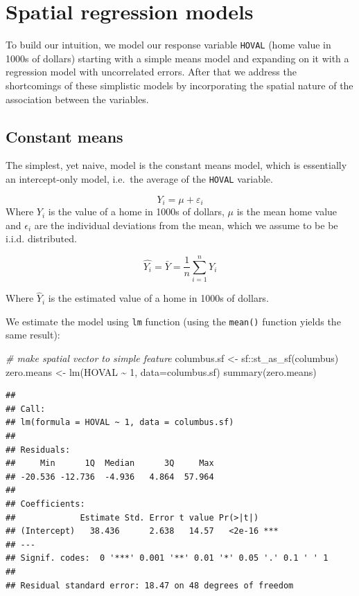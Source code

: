 \documentclass[
]{article}
\newenvironment{Shaded}{\begin{snugshade}}{\end{snugshade}}
\newcommand{\AttributeTok}[1]{\textcolor[rgb]{0.77,0.63,0.00}{#1}}
\newcommand{\CommentTok}[1]{\textcolor[rgb]{0.56,0.35,0.01}{\textit{#1}}}
\newcommand{\DecValTok}[1]{\textcolor[rgb]{0.00,0.00,0.81}{#1}}
\newcommand{\FunctionTok}[1]{\textcolor[rgb]{0.00,0.00,0.00}{#1}}
\newcommand{\NormalTok}[1]{#1}
\newcommand{\OtherTok}[1]{\textcolor[rgb]{0.56,0.35,0.01}{#1}}
\newcommand{\SpecialCharTok}[1]{\textcolor[rgb]{0.00,0.00,0.00}{#1}}
\begin{document}
\hypertarget{spatial-regression-models}{%
\section{Spatial regression models}\label{spatial-regression-models}}

To build our intuition, we model our response variable \texttt{HOVAL}
(home value in 1000s of dollars) starting with a simple means model and
expanding on it with a regression model with uncorrelated errors. After
that we address the shortcomings of these simplistic models by
incorporating the spatial nature of the association between the
variables.

\hypertarget{constant-means}{%
\subsection{Constant means}\label{constant-means}}

The simplest, yet naive, model is the constant means model, which is
essentially an intercept-only model, i.e.~the average of the
\texttt{HOVAL} variable.

\[
Y_i=\mu+\varepsilon_i
\] Where \(Y_i\) is the value of a home in 1000s of dollars, \(\mu\) is
the mean home value and \(\epsilon_i\) are the individual deviations
from the mean, which we assume to be be i.i.d. distributed.

\[
\hat{Y_i} = \bar{Y} = \frac{1}{n}\sum_{i=1}^{n}Y_i
\]

Where \(\hat{Y}_i\) is the estimated value of a home in 1000s of
dollars.

We estimate the model using \texttt{lm} function (using the
\texttt{mean()} function yields the same result):

\begin{Shaded}
\begin{Highlighting}[]
\CommentTok{\# make spatial vector to simple feature}
\NormalTok{columbus.sf }\OtherTok{\textless{}{-}}\NormalTok{ sf}\SpecialCharTok{::}\FunctionTok{st\_as\_sf}\NormalTok{(columbus)}
\NormalTok{zero.means }\OtherTok{\textless{}{-}} \FunctionTok{lm}\NormalTok{(HOVAL }\SpecialCharTok{\textasciitilde{}} \DecValTok{1}\NormalTok{, }\AttributeTok{data=}\NormalTok{columbus.sf)}
\FunctionTok{summary}\NormalTok{(zero.means)}
\end{Highlighting}
\end{Shaded}

\begin{verbatim}
## 
## Call:
## lm(formula = HOVAL ~ 1, data = columbus.sf)
## 
## Residuals:
##     Min      1Q  Median      3Q     Max 
## -20.536 -12.736  -4.936   4.864  57.964 
## 
## Coefficients:
##             Estimate Std. Error t value Pr(>|t|)    
## (Intercept)   38.436      2.638   14.57   <2e-16 ***
## ---
## Signif. codes:  0 '***' 0.001 '**' 0.01 '*' 0.05 '.' 0.1 ' ' 1
## 
## Residual standard error: 18.47 on 48 degrees of freedom
\end{verbatim}
\end{document}
